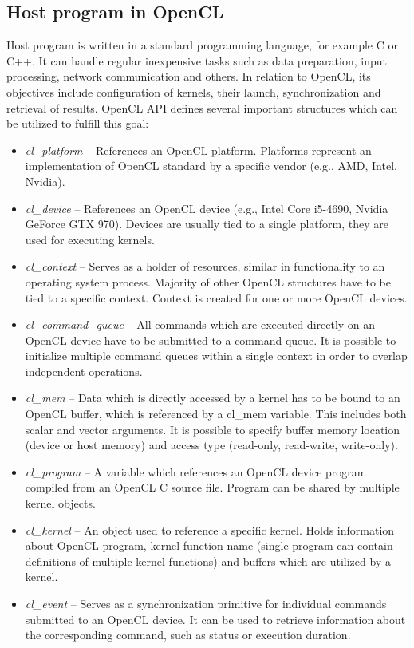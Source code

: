 \documentclass
[
    digital, %
    oneside, %
    table, %
    nolof, %
    nolot, %
    nocover %
]{fithesis3}
\begin{document}
\subsection{Host program in OpenCL}
Host program is written in a standard programming language, for example C or C++. It can handle regular inexpensive tasks such as data preparation,
input processing, network communication and others. In relation to OpenCL, its objectives include configuration of kernels, their launch,
synchronization and retrieval of results. OpenCL API defines several important structures which can be utilized to fulfill this goal:
\begin{itemize}
    \item \textit{cl\_platform} -- References an OpenCL platform. Platforms represent an implementation of OpenCL standard by a specific vendor
    (e.g., AMD, Intel, Nvidia). 
    \item \textit{cl\_device} -- References an OpenCL device (e.g., Intel Core i5-4690, Nvidia GeForce GTX 970). Devices are usually tied to a single
    platform, they are used for executing kernels.
    \item \textit{cl\_context} -- Serves as a holder of resources, similar in functionality to an operating system process. Majority of other OpenCL
    structures have to be tied to a specific context. Context is created for one or more OpenCL devices.
    \item \textit{cl\_command\_queue} -- All commands which are executed directly on an OpenCL device have to be submitted to a command queue. It
    is possible to initialize multiple command queues within a single context in order to overlap independent operations.
    \item \textit{cl\_mem} -- Data which is directly accessed by a kernel has to be bound to an OpenCL buffer, which is referenced by a cl\_mem variable.
    This includes both scalar and vector arguments. It is possible to specify buffer memory location (device or host memory) and access type (read-only,
    read-write, write-only).
    \item \textit{cl\_program} -- A variable which references an OpenCL device program compiled from an OpenCL C source file. Program can be shared by
    multiple kernel objects.
    \item \textit{cl\_kernel} -- An object used to reference a specific kernel. Holds information about OpenCL program, kernel function name (single
    program can contain definitions of multiple kernel functions) and buffers which are utilized by a kernel.
    \item \textit{cl\_event} -- Serves as a synchronization primitive for individual commands submitted to an OpenCL device. It can be used to retrieve
    information about the corresponding command, such as status or execution duration.
\end{itemize}
\end{document}
